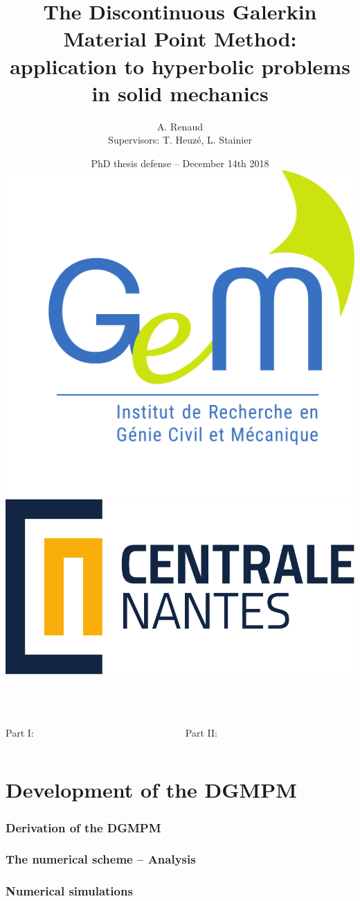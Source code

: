 \documentclass[11pt,aspectratio=1610]{beamer}
\title[The Discontinuous Galerkin Material Point Method]
{\Large\bf  {The Discontinuous Galerkin Material Point Method: \\application to hyperbolic problems in solid mechanics}}
\date[]{
	\footnotesize{PhD thesis defense} --
	December 14th 2018 \\ \hspace*{7.cm}\includegraphics[trim = 0cm 4cm 0cm 0cm, clip,scale=0.1]{Logo_GEM.pdf} \hspace*{2.cm}\includegraphics[scale=0.25]{Logo_ECN.pdf}}%
\author{A. Renaud \\ Supervisors: T. Heuz\'e, L. Stainier}
\makeatletter
\let\oldpart\part
\def\part#1{\def\@currentlabelname{#1}\oldpart{#1}}
\makeatother
\begin{document}
\begin{frame}[plain]
  \maketitle
\end{frame}







\begin{frame}[plain,]
  \begin{columns}
    \begin{column}{0.45\textwidth}
      \begin{block}{Part I:  \insertpart}
        \tableofcontents[part=1,hideallsubsections]
      \end{block}
    \end{column}
    \begin{column}{0.55\textwidth}
      \begin{block}{Part II: }
        \tableofcontents[part=2,hideallsubsections]
      \end{block}
    \end{column}
  \end{columns}
\end{frame}

\part{Development of the DGMPM}

\label{part:part1}




\section{Derivation of the DGMPM}



\section{The numerical scheme -- Analysis}




\section{Numerical simulations}

\end{document}
